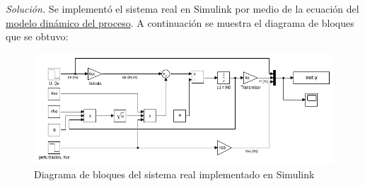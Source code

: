 \textit{Solución.} Se implementó el sistema real en Simulink por medio de la ecuación del \hyperref[eq1]{modelo dinámico del proceso}. A continuación se muestra el diagrama de bloques que se obtuvo:

\begin{figure}[!h]
    \centering
    \includegraphics[width = 0.8\linewidth]{figs/fig2.png}
    \caption{Diagrama de bloques del sistema real implementado en Simulink}
    \label{fig2}
\end{figure}

